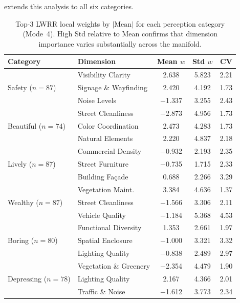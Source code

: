 \documentclass[runningheads]{llncs}
\begin{document}
 extends this analysis to all six categories.

\begin{table}[ht]
\centering
\caption{Top-3 LWRR local weights by $|\text{Mean}|$ for each perception category (Mode~4). High Std relative to Mean confirms that dimension importance varies substantially across the manifold.}
\label{tab:weight_variation_all}
\small
\setlength{\tabcolsep}{4pt}
\begin{tabular}{llccc}
\toprule
Category & Dimension & Mean $w$ & Std $w$ & CV \\
\midrule
\multirow{3}{*}{Safety ($n{=}87$)}
& Visibility Clarity      & 2.638  & 5.823 & 2.21 \\
& Signage \& Wayfinding   & 2.420  & 4.192 & 1.73 \\
& Noise Levels            & $-$1.337 & 3.255 & 2.43 \\
\midrule
\multirow{3}{*}{Beautiful ($n{=}74$)}
& Street Cleanliness      & $-$2.873 & 4.956 & 1.73 \\
& Color Coordination      & 2.473  & 4.283 & 1.73 \\
& Natural Elements        & 2.220  & 4.837 & 2.18 \\
\midrule
\multirow{3}{*}{Lively ($n{=}87$)}
& Commercial Density      & $-$0.932 & 2.193 & 2.35 \\
& Street Furniture        & $-$0.735 & 1.715 & 2.33 \\
& Building Fa\c{c}ade     & 0.688  & 2.266 & 3.29 \\
\midrule
\multirow{3}{*}{Wealthy ($n{=}87$)}
& Vegetation Maint.       & 3.384  & 4.636 & 1.37 \\
& Street Cleanliness      & $-$1.566 & 3.306 & 2.11 \\
& Vehicle Quality         & $-$1.184 & 5.368 & 4.53 \\
\midrule
\multirow{3}{*}{Boring ($n{=}80$)}
& Functional Diversity    & 1.353  & 2.661 & 1.97 \\
& Spatial Enclosure       & $-$1.000 & 3.321 & 3.32 \\
& Lighting Quality        & $-$0.838 & 2.489 & 2.97 \\
\midrule
\multirow{3}{*}{Depressing ($n{=}78$)}
& Vegetation \& Greenery  & $-$2.354 & 4.479 & 1.90 \\
& Lighting Quality        & 2.167  & 4.366 & 2.01 \\
& Traffic \& Noise        & $-$1.612 & 3.773 & 2.34 \\
\bottomrule
\end{tabular}
\end{table}
\end{document}
